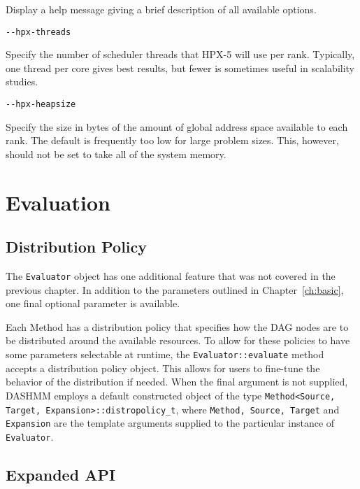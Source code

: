\noindent Display a help message giving a brief description of all
available options.

\begin{lstlisting}
--hpx-threads
\end{lstlisting}

\noindent Specify the number of scheduler threads that HPX-5 will use per rank.
Typically, one thread per core gives best results, but fewer is sometimes
useful in scalability studies.

\begin{lstlisting}
--hpx-heapsize
\end{lstlisting}

\noindent Specify the size in bytes of the amount of global address space
available to each rank. The default is frequently too low for large problem
sizes. This, however, should not be set to take all of the system memory.



\section{Evaluation}

\subsection{Distribution Policy}

The \texttt{Evaluator} object has one additional feature that was not
covered in the previous chapter. In addition to the parameters outlined
in Chapter~\ref{ch:basic}, one final optional parameter is available.

Each Method has a distribution policy that specifies how the DAG nodes are
to be distributed around the available resources. To allow for these policies
to have some parameters selectable at runtime, the
\texttt{Evaluator::evaluate} method accepts a distribution policy object.
This allows for users to fine-tune the behavior of the distribution if needed.
When the final argument is not supplied, DASHMM employs a default constructed
object of the type \texttt{Method<Source, Target, Expansion>::distropolicy\_t},
where \texttt{Method, Source, Target} and \texttt{Expansion} are the template
arguments supplied to the particular instance of \texttt{Evaluator}.

\subsection{Expanded API}

